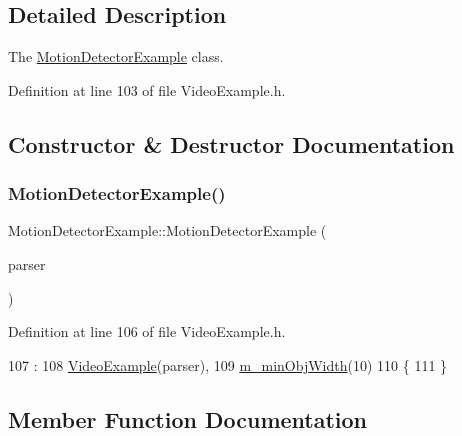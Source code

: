 \subsection{Detailed Description}
The \mbox{\hyperlink{class_motion_detector_example}{Motion\+Detector\+Example}} class. 

Definition at line 103 of file Video\+Example.\+h.



\subsection{Constructor \& Destructor Documentation}
\mbox{\label{class_motion_detector_example_a45f6928de240a6ac41a9b94027972d80}} 
\subsubsection{\texorpdfstring{Motion\+Detector\+Example()}{MotionDetectorExample()}}
{\footnotesize\ttfamily Motion\+Detector\+Example\+::\+Motion\+Detector\+Example (\begin{DoxyParamCaption}\item[{const cv\+::\+Command\+Line\+Parser \&}]{parser }\end{DoxyParamCaption})\hspace{0.3cm}{\ttfamily [inline]}}



Definition at line 106 of file Video\+Example.\+h.


\begin{DoxyCode}
107         :
108           \mbox{\hyperlink{class_video_example_aedc40ab44835e8ad1cf731b7709cd4ac}{VideoExample}}(parser),
109           \mbox{\hyperlink{class_motion_detector_example_a1ea131c2071f3a7dd87b6c47cdaf997e}{m\_minObjWidth}}(10)
110     \{
111     \}
\end{DoxyCode}


\subsection{Member Function Documentation}
\mbox{\label{class_video_example_ace8617201da40b6e230bd6c049b48aa0}} 
